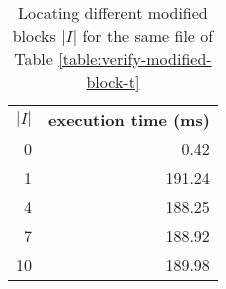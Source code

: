 \begin{table}[ht]
\centering
\begin{tabular}{rr}
\multicolumn{1}{l}{\textbf{$|I|$}} & \multicolumn{1}{l}{\textbf{execution time (ms)}} \\
0                                & 0.42                                             \\
1                                & 191.24                                           \\
4                                & 188.25                                           \\
7                                & 188.92                                           \\
10                               & 189.98                                          
\end{tabular}
    \caption{Locating different modified blocks $|I|$ for the same file of Table \ref{table:verify-modified-block-t}}
    \label{table:verify-different-i-modified}
\end{table}